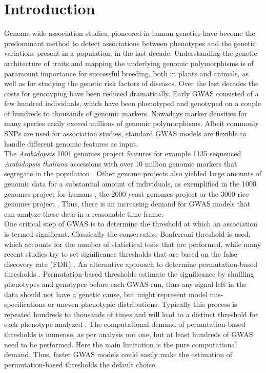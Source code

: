\section{Introduction}
Genome-wide association studies, pioneered in human genetics \cite{Hirschhorn2005} have
become the predominant method to detect associations between phenotypes and the genetic
variations present in a population, in the last decade. Understanding the genetic
architecture of traits and mapping the underlying genomic polymorphisms is of paramount
importance for successful breeding, both in plants and animals, as well as for studying
the genetic risk factors of diseases. Over the last decades the costs for genotyping have
been reduced dramatically. Early GWAS consisted of a few hundred individuals, which have
been phenotyped and genotyped on a couple of hundreds to thousands of genomic
markers. Nowadays marker densities for many species easily exceed millions of genomic
polymorphisms. Albeit commonly SNPs are used for association studies, standard GWAS models
are flexible to handle different genomic features as input. \\
The \textit{Arabidopsis} 1001 genomes project features for example 1135 sequenced
\textit{Arabidopsis thaliana} accessions with over 10 million genomic markers that
segregate in the population \cite{1001genome}. Other genome projects also yielded large
amounts of genomic data for a substantial amount of individuals, as exemplified in the
1000 genomes project for humans \cite{1000genome}, the 2000 yeast genomes project or the
3000 rice genomes project \cite{3000genome}. Thus, there is an increasing demand for GWAS
models that can analyze these data in a reasonable time frame.\\
One critical step of GWAS is to determine the threshold at which an association is termed
significant. Classically the conservative Bonferroni threshold is used, which accounts for
the number of statistical tests that are performed, while many recent studies try to set
significance thresholds that are based on the false-discovery rate (FDR)
\cite{Storey9440}. An alternative approach to determine permutation-based thresholds
\cite{che2014adaptive}. Permutation-based thresholds estimate the significance by
shuffling phenotypes and genotypes before each GWAS run, thus any signal left in the data
should not have a genetic cause, but might represent model mis-specifications or uneven
phenotypic distributions. Typically this process is repeated hundreds to thousands of
times and will lead to a distinct threshold for each phenotype analyzed
\cite{togninalli2017aragwas}. The computational demand of permutation-based thresholds is
immense, as per analysis not one, but at least hundreds of GWAS need to be performed. Here
the main limitation is the pure computational demand. Thus, faster GWAS models could
easily make the estimation of permutation-based thresholds the default choice.

